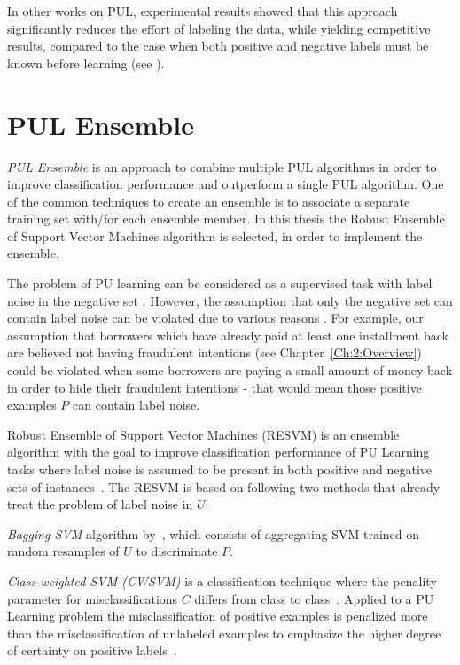 In other works on PUL, experimental results showed that this approach significantly reduces the effort of labeling the data, while yielding competitive results, compared to the case when both positive and negative labels must be known before learning (see \cite{Li:2011}).

\section{PUL Ensemble}\label{Chapter:Ensemble}
\textit{PUL Ensemble} is an approach to combine multiple PUL algorithms in order to improve classification performance and outperform a single PUL algorithm. One of the common techniques to create an ensemble is to associate a separate training set with/for each ensemble member. In this thesis the Robust Ensemble of Support Vector Machines algorithm \cite{Claesen:2014} is selected, in order to implement the ensemble.

The problem of PU learning can be considered as a supervised task with label noise in the negative set \cite{Claesen:2014}. However, the assumption that only the negative set can contain label noise can be violated due to various reasons \cite{journals/tnn/FrenayV14}. For example, our assumption that borrowers which have already paid at least one installment back are believed not having fraudulent intentions (see Chapter~\ref{Ch:2:Overview}) could be violated when some borrowers are paying a small amount of money back in order to hide their fraudulent intentions - that would mean those positive examples \(P\) can contain label noise.

Robust Ensemble of Support Vector Machines (RESVM) is an ensemble algorithm with the goal to improve classification performance of PU Learning tasks where label noise is assumed to be present in both positive and negative sets of instances~\cite{Claesen:2014}. The RESVM is based on following two methods that already treat the problem of label noise in \(U\):

\textit{Bagging SVM} algorithm by~\cite{journals/prl/MordeletV14}, which consists of aggregating SVM trained on random resamples of \(U\) to discriminate \(P\). 

\textit{Class-weighted SVM (CWSVM)} is a classification technique where the penality parameter for misclassifications \(C\) differs from class to class~\cite{conf/icdm/LiuDLLY03}. Applied to a PU Learning problem the misclassification of positive examples is penalized more than the misclassification of unlabeled examples to emphasize the higher degree of certainty on positive labels~\cite{Claesen:2014}.

